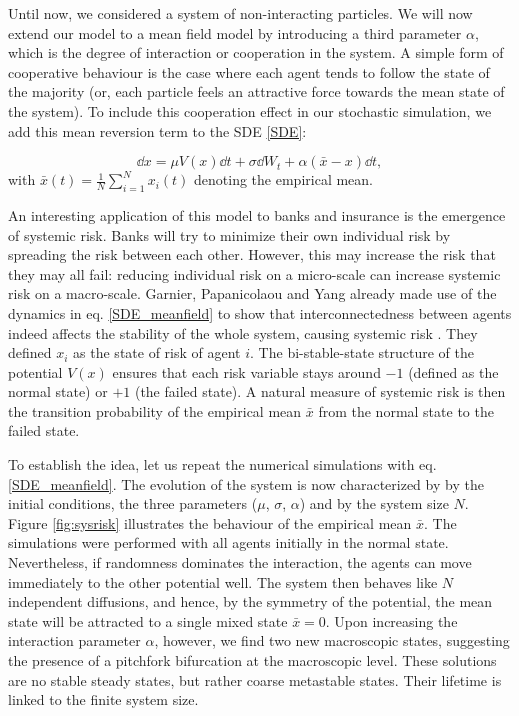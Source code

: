 
Until now, we considered a system of non-interacting particles. We will now extend our model to a mean field model by introducing a third parameter $\alpha$, which is the degree of interaction or cooperation in the system. A simple form of cooperative behaviour is the case where each agent tends to follow the state of the majority (or, each particle feels an attractive force towards the mean state of the system). To include this cooperation effect in our stochastic simulation, we add this mean reversion term to the SDE \eqref{SDE}:

\begin{equation} 
\label{SDE_meanfield}
    \dd x = \mu V(x) \dd t + \sigma  \dd{W_t} + \alpha(\bar{x} -x) \dd t ,
\end{equation}
with  $\bar{x}(t) = \frac{1}{N} \sum_{i=1}^{N} x_i(t)$ denoting the empirical mean. 


An interesting application of this model to banks and insurance is the emergence of systemic risk.  Banks will try to minimize their own individual risk by spreading the risk between each other. However, this may increase the risk that they may all fail: reducing individual risk on a micro-scale can increase systemic risk on a macro-scale. 
Garnier, Papanicolaou and Yang already made use of the dynamics in eq. \eqref{SDE_meanfield}  to show that interconnectedness between agents indeed affects the stability of the whole system, causing systemic risk  \cite{Garnier}. They defined $x_i$  as the state of risk of agent $i$. The bi-stable-state structure of the potential $V(x)$ ensures that each risk variable stays around $-1$ (defined as the normal state) or $+1$ (the failed state).  A natural measure of systemic risk is then the transition probability of the empirical mean $\bar{x}$ from the normal state to the failed state. 
 

To establish the idea, let us repeat the numerical simulations with eq. \ref{SDE_meanfield}. The evolution of the system is now characterized by  by the initial conditions, the three parameters ($\mu$, $\sigma$, $\alpha$) and by the system size $N$. Figure \ref{fig:sysrisk}  illustrates the behaviour of the empirical mean $\bar{x}$. The simulations were performed with all agents initially in the normal state. Nevertheless, if randomness dominates the interaction, the agents can move immediately to the other potential well. The system then behaves like $N$ independent diffusions, and hence, by the symmetry of the potential, the mean state will be attracted to a single mixed state $\bar{x}=0$. Upon increasing the interaction parameter $\alpha$, however, we find two new macroscopic states, suggesting the presence of a pitchfork bifurcation at the macroscopic level. These solutions are no stable steady states, but rather coarse metastable states. Their lifetime is linked to the finite system size. 



